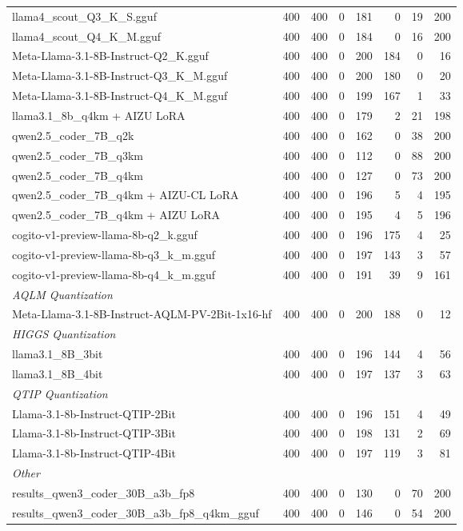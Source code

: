 \begin{table}[htbp]
{\begin{tabular}{lrrrrrrr}
    llama4\_scout\_Q3\_K\_S.gguf & 400 & 400 & 0 & 181 & 0 & 19 & 200 \\
    llama4\_scout\_Q4\_K\_M.gguf & 400 & 400 & 0 & 184 & 0 & 16 & 200 \\
    Meta-Llama-3.1-8B-Instruct-Q2\_K.gguf & 400 & 400 & 0 & 200 & 184 & 0 & 16 \\
    Meta-Llama-3.1-8B-Instruct-Q3\_K\_M.gguf & 400 & 400 & 0 & 200 & 180 & 0 & 20 \\
    Meta-Llama-3.1-8B-Instruct-Q4\_K\_M.gguf & 400 & 400 & 0 & 199 & 167 & 1 & 33 \\
    llama3.1\_8b\_q4km + AIZU LoRA & 400 & 400 & 0 & 179 & 2 & 21 & 198 \\
    qwen2.5\_coder\_7B\_q2k & 400 & 400 & 0 & 162 & 0 & 38 & 200 \\
    qwen2.5\_coder\_7B\_q3km & 400 & 400 & 0 & 112 & 0 & 88 & 200 \\
    qwen2.5\_coder\_7B\_q4km & 400 & 400 & 0 & 127 & 0 & 73 & 200 \\
    qwen2.5\_coder\_7B\_q4km + AIZU-CL LoRA & 400 & 400 & 0 & 196 & 5 & 4 & 195 \\
    qwen2.5\_coder\_7B\_q4km + AIZU LoRA & 400 & 400 & 0 & 195 & 4 & 5 & 196 \\
    cogito-v1-preview-llama-8b-q2\_k.gguf & 400 & 400 & 0 & 196 & 175 & 4 & 25 \\
    cogito-v1-preview-llama-8b-q3\_k\_m.gguf & 400 & 400 & 0 & 197 & 143 & 3 & 57 \\
    cogito-v1-preview-llama-8b-q4\_k\_m.gguf & 400 & 400 & 0 & 191 & 39 & 9 & 161 \\
    \midrule
    \multicolumn{8}{l}{\textit{AQLM Quantization}} \\
    \midrule
    Meta-Llama-3.1-8B-Instruct-AQLM-PV-2Bit-1x16-hf & 400 & 400 & 0 & 200 & 188 & 0 & 12 \\
    \midrule
    \multicolumn{8}{l}{\textit{HIGGS Quantization}} \\
    \midrule
    llama3.1\_8B\_3bit & 400 & 400 & 0 & 196 & 144 & 4 & 56 \\
    llama3.1\_8B\_4bit & 400 & 400 & 0 & 197 & 137 & 3 & 63 \\
    \midrule
    \multicolumn{8}{l}{\textit{QTIP Quantization}} \\
    \midrule
    Llama-3.1-8b-Instruct-QTIP-2Bit & 400 & 400 & 0 & 196 & 151 & 4 & 49 \\
    Llama-3.1-8b-Instruct-QTIP-3Bit & 400 & 400 & 0 & 198 & 131 & 2 & 69 \\
    Llama-3.1-8b-Instruct-QTIP-4Bit & 400 & 400 & 0 & 197 & 119 & 3 & 81 \\
    \midrule
    \multicolumn{8}{l}{\textit{Other}} \\
    \midrule
    results\_qwen3\_coder\_30B\_a3b\_fp8 & 400 & 400 & 0 & 130 & 0 & 70 & 200 \\
    results\_qwen3\_coder\_30B\_a3b\_fp8\_q4km\_gguf & 400 & 400 & 0 & 146 & 0 & 54 & 200 \\
    \bottomrule
  \end{tabular}
  }
\end{table}

